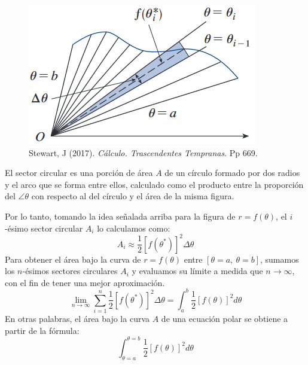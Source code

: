 \documentclass[12pt]{article}
\begin{document}
\begin{figure}[hbt!]
\centering
\includegraphics[scale=0.5]{02_area-ec-polar.jpg}
\caption{Stewart, J (2017). \textit{Cálculo. Trascendentes Tempranas}. Pp 669.}
\end{figure}

El sector circular es una porción de área $A$ de un círculo formado por dos radios y el arco que se forma entre ellos, calculado como el producto entre la proporción del $\angle \theta$ con respecto al del círculo y el área de la misma figura.

\begin{figure}[hbt!]

\centering


\end{figure}

Por lo tanto, tomando la idea señalada arriba para la figura de $r = f(\theta)$, el $i$-ésimo sector circular $A_{i}$ lo calculamos como:
\[
  A_{i} \approx \frac{1}{2} [f(\theta^{*})]^{2} \Delta \theta
\]
Para obtener el área bajo la curva de $r = f(\theta)$ entre $[\theta = a, \ \theta = b]$, sumamos los $n$-ésimos sectores circulares $A_{i}$ y evaluamos su límite a medida que $n \to \infty$, con el fin de tener una mejor aproximación.
\[
  \lim_{n \to \infty} \sum_{i = 1}^{n} \frac{1}{2} [f(\theta^{*})]^{2} \Delta \theta = \int_{a}^{b} \frac{1}{2} [f(\theta)]^{2} d\theta
\]
En otras palabras, el área bajo la curva $A$ de una ecuación polar se obtiene a partir de la fórmula:
\[
  \int_{\theta = a}^{\theta = b} \frac{1}{2} [f(\theta)]^{2} d\theta
\]
\end{document}
